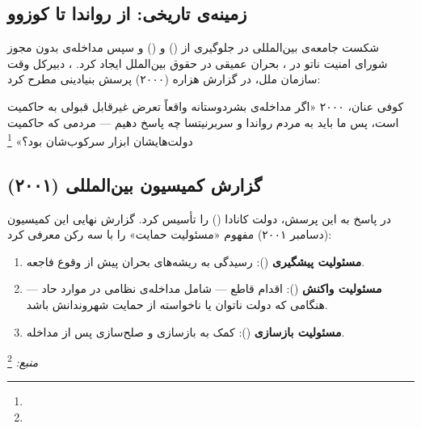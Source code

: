 \subsection{زمینه‌ی تاریخی: از رواندا تا کوزوو}
\label{subsec:ch02-r2p-background}

شکست جامعه‌ی بین‌المللی در جلوگیری از  () و  () و سپس مداخله‌ی بدون مجوز شورای امنیت ناتو در ، بحران عمیقی در حقوق بین‌الملل ایجاد کرد. ، دبیرکل وقت سازمان ملل، در گزارش هزاره (۲۰۰۰) پرسش بنیادینی مطرح کرد:

\begin{histQuote}{کوفی عنان، ۲۰۰۰}
«اگر مداخله‌ی بشردوستانه واقعاً تعرض غیرقابل قبولی به حاکمیت است، پس ما باید به مردم رواندا و سربرنیتسا چه پاسخ دهیم — مردمی که حاکمیت دولت‌هایشان ابزار سرکوب‌شان بود؟»%
\footnote{}
\end{histQuote}

\subsection{گزارش کمیسیون بین‌المللی (۲۰۰۱)}
\label{subsec:ch02-iciss}

در پاسخ به این پرسش، دولت کانادا  () را تأسیس کرد. گزارش نهایی این کمیسیون (دسامبر ۲۰۰۱) مفهوم «مسئولیت حمایت» را با سه رکن معرفی کرد:

\begin{tcolorbox}[legalbox, title={سه رکن مسئولیت حمایت}]
\begin{enumerate}[nosep, label=\textbf{رکن \arabic*:}]
  \item \textbf{مسئولیت پیشگیری} (): رسیدگی به ریشه‌های بحران پیش از وقوع فاجعه.
  \item \textbf{مسئولیت واکنش} (): اقدام قاطع — شامل مداخله‌ی نظامی در موارد حاد — هنگامی که دولت ناتوان یا ناخواسته از حمایت شهروندانش باشد.
  \item \textbf{مسئولیت بازسازی} (): کمک به بازسازی و صلح‌سازی پس از مداخله.
\end{enumerate}
\vspace{6pt}
\textit{منبع:} %
\footnote{}
\end{tcolorbox}

